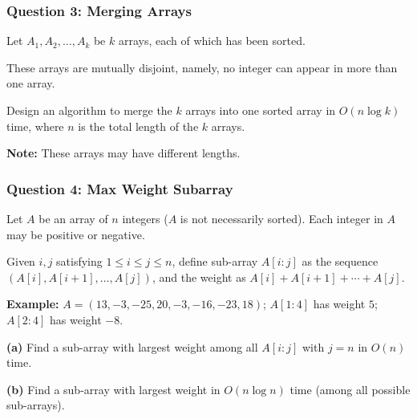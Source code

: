 \documentclass{beamer}
\begin{document}
\begin{frame}
\end{frame}

\begin{frame}
\end{frame}

\begin{frame}
\frametitle{Question 3: Merging Arrays}

Let $A_1, A_2, \ldots, A_k$ be $k$ arrays, each of which has been sorted.

\vspace{0.3cm}

These arrays are mutually disjoint, namely, no integer can appear in more than one array.

\vspace{0.3cm}

Design an algorithm to merge the $k$ arrays into one sorted array in $O(n \log k)$ time, where $n$ is the total length of the $k$ arrays.

\vspace{0.3cm}

\textbf{Note:} These arrays may have different lengths.

\end{frame}

\begin{frame}
\end{frame}

\begin{frame}
\end{frame}

\begin{frame}
\frametitle{Question 4: Max Weight Subarray}

Let $A$ be an array of $n$ integers ($A$ is not necessarily sorted). Each integer in $A$ may be positive or negative.

Given $i, j$ satisfying $1 \le i \le j \le n$, define sub-array $A[i:j]$ as the sequence $(A[i], A[i+1], \ldots, A[j])$, and the weight as $A[i] + A[i+1] + \cdots + A[j]$.

\vspace{0.3cm}

\textbf{Example:} $A = (13, -3, -25, 20, -3, -16, -23, 18)$; $A[1:4]$ has weight $5$; $A[2:4]$ has weight $-8$.

\vspace{0.3cm}

\textbf{(a)} Find a sub-array with largest weight among all $A[i:j]$ with $j = n$ in $O(n)$ time.

\vspace{0.2cm}

\textbf{(b)} Find a sub-array with largest weight in $O(n \log n)$ time (among all possible sub-arrays).

\end{frame}
\end{document}
